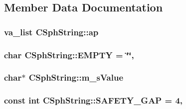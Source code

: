\subsection{Member Data Documentation}
\hypertarget{structCSphString_a4c58ce65bc91d1bbc191864b1f76b8e1}{
\subsubsection[{ap}]{\setlength{\rightskip}{0pt plus 5cm}va\-\_\-list C\-Sph\-String\-::ap}}\label{structCSphString_a4c58ce65bc91d1bbc191864b1f76b8e1}
\hypertarget{structCSphString_ace1090ac1799f9efee5c0b6eddec9fc3}{
\subsubsection[{E\-M\-P\-T\-Y}]{\setlength{\rightskip}{0pt plus 5cm}char C\-Sph\-String\-::\-E\-M\-P\-T\-Y = \char`\"{}\char`\"{}\hspace{0.3cm}{\ttfamily [static]}, {\ttfamily [protected]}}}\label{structCSphString_ace1090ac1799f9efee5c0b6eddec9fc3}
\hypertarget{structCSphString_aa50edef52196b0da669df201b63364ae}{
\subsubsection[{m\-\_\-s\-Value}]{\setlength{\rightskip}{0pt plus 5cm}char$\ast$ C\-Sph\-String\-::m\-\_\-s\-Value\hspace{0.3cm}{\ttfamily [protected]}}}\label{structCSphString_aa50edef52196b0da669df201b63364ae}
\hypertarget{structCSphString_abc41c0298d1db9d9a09c839a926b2f2e}{
\subsubsection[{S\-A\-F\-E\-T\-Y\-\_\-\-G\-A\-P}]{\setlength{\rightskip}{0pt plus 5cm}const {\bf int} C\-Sph\-String\-::\-S\-A\-F\-E\-T\-Y\-\_\-\-G\-A\-P = 4\hspace{0.3cm}{\ttfamily [static]}, {\ttfamily [private]}}}\label{structCSphString_abc41c0298d1db9d9a09c839a926b2f2e}
